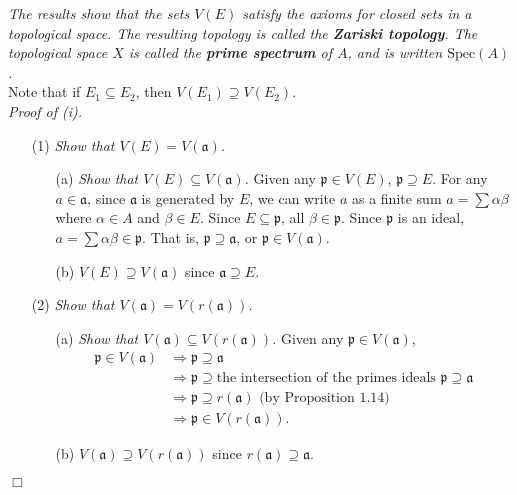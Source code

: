\documentclass{article}
\begin{document}
\emph{The results show that the sets $V(E)$ satisfy
the axioms for closed sets in a topological space.
The resulting topology is called the \textbf{Zariski topology}.
The topological space $X$ is called the \textbf{prime spectrum} of $A$,
and is written $\mathrm{Spec}(A)$.} \\



Note that if $E_1 \subseteq E_2$,
then $V(E_1) \supseteq V(E_2)$. \\



\emph{Proof of (i).}
\begin{enumerate}
\item[(1)]
  \emph{Show that $V(E) = V(\mathfrak{a})$.}
    \begin{enumerate}
    \item[(a)]
      \emph{Show that $V(E) \subseteq V(\mathfrak{a})$.}
      Given any $\mathfrak{p} \in V(E)$, $\mathfrak{p} \supseteq E$.
      For any $a \in \mathfrak{a}$,
      since $\mathfrak{a}$ is generated by $E$,
      we can write $a$ as a finite sum
      $a = \sum \alpha \beta$ where $\alpha \in A$ and $\beta \in E$.
      Since $E \subseteq \mathfrak{p}$, all $\beta \in \mathfrak{p}$.
      Since $\mathfrak{p}$ is an ideal,
      $a = \sum \alpha \beta \in \mathfrak{p}$.
      That is, $\mathfrak{p} \supseteq \mathfrak{a}$,
      or $\mathfrak{p} \in V(\mathfrak{a})$.
    
    \item[(b)]
      \emph{$V(E) \supseteq V(\mathfrak{a})$} since $\mathfrak{a} \supseteq E$.
    \end{enumerate}

\item[(2)]
  \emph{Show that $V(\mathfrak{a}) = V(r(\mathfrak{a}))$.}
    \begin{enumerate}
    \item[(a)]
      \emph{Show that $V(\mathfrak{a}) \subseteq V(r(\mathfrak{a}))$.}
      Given any $\mathfrak{p} \in V(\mathfrak{a})$,
      \begin{align*}
        \mathfrak{p} \in V(\mathfrak{a})
        &\Longrightarrow \mathfrak{p} \supseteq \mathfrak{a} \\
        &\Longrightarrow \mathfrak{p} \supseteq \text{the intersection of the primes ideals }
        \mathfrak{p} \supseteq \mathfrak{a} \\
        &\Longrightarrow \mathfrak{p} \supseteq r(\mathfrak{a}) \text{ (by Proposition 1.14)}\\
        &\Longrightarrow \mathfrak{p} \in V(r(\mathfrak{a})).
      \end{align*}

    \item[(b)]
      \emph{$V(\mathfrak{a}) \supseteq V(r(\mathfrak{a}))$}
      since $r(\mathfrak{a}) \supseteq \mathfrak{a}$.
    \end{enumerate}
\end{enumerate}
$\Box$ \\
\end{document}
